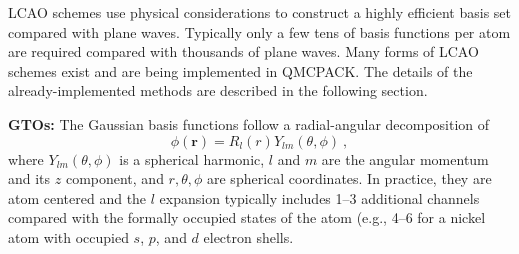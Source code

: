 %
%

LCAO schemes use physical considerations to construct a highly
efficient basis set compared with plane waves. Typically only a few tens
of basis functions per atom are required compared with thousands of
plane waves. Many forms of LCAO schemes exist and are being
implemented in QMCPACK. The details of the already-implemented methods
are described in the following section.

\noindent \textbf{GTOs:}
 The Gaussian basis functions follow a radial-angular decomposition of
\begin{equation}
     \phi (\mathbf{r} )=R_{l}(r)Y_{lm}(\theta ,\phi )\:,
\end{equation}
where $ Y_{{lm}}(\theta ,\phi )$ is a spherical harmonic, $l$ and $m$
are the angular momentum and its $z$ component, and $r, \theta, \phi$
are spherical coordinates. In practice, they are atom centered and the
$l$ expansion typically includes 1--3 additional channels compared with
the formally occupied states of the atom (e.g., 4--6 for a nickel atom with
occupied $s$, $p$, and $d$ electron shells.

